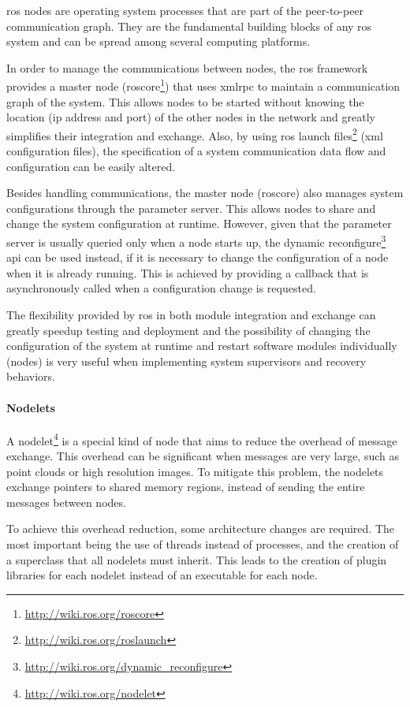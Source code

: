 \gls{ros} nodes are operating system processes that are part of the peer-to-peer communication graph. They are the fundamental building blocks of any \gls{ros} system and can be spread among several computing platforms.

In order to manage the communications between nodes, the \gls{ros} framework provides a master node (roscore\footnote{\url{http://wiki.ros.org/roscore}}) that uses \gls{xmlrpc} to maintain a communication graph of the system. This allows nodes to be started without knowing the location (\gls{ip} address and port) of the other nodes in the network and greatly simplifies their integration and exchange. Also, by using \gls{ros} launch files\footnote{\url{http://wiki.ros.org/roslaunch}} (\gls{xml} configuration files), the specification of a system communication data flow and configuration can be easily altered.

Besides handling communications, the master node (roscore) also manages system configurations through the parameter server. This allows nodes to share and change the system configuration at runtime. However, given that the parameter server is usually queried only when a node starts up, the dynamic reconfigure\footnote{\url{http://wiki.ros.org/dynamic_reconfigure}} \gls{api} can be used instead, if it is necessary to change the configuration of a node when it is already running. This is achieved by providing a callback that is asynchronously called when a configuration change is requested.

The flexibility provided by \gls{ros} in both module integration and exchange can greatly speedup testing and deployment and the possibility of changing the configuration of the system at runtime and restart software modules individually (nodes) is very useful when implementing system supervisors and recovery behaviors.


\paragraph{Nodelets}

A nodelet\footnote{\url{http://wiki.ros.org/nodelet}} is a special kind of node that aims to reduce the overhead of message exchange. This overhead can be significant when messages are very large, such as point clouds or high resolution images. To mitigate this problem, the nodelets exchange pointers to shared memory regions, instead of sending the entire messages between nodes.

To achieve this overhead reduction, some architecture changes are required. The most important being the use of threads instead of processes, and the creation of a superclass that all nodelets must inherit. This leads to the creation of plugin libraries for each nodelet instead of an executable for each node.

